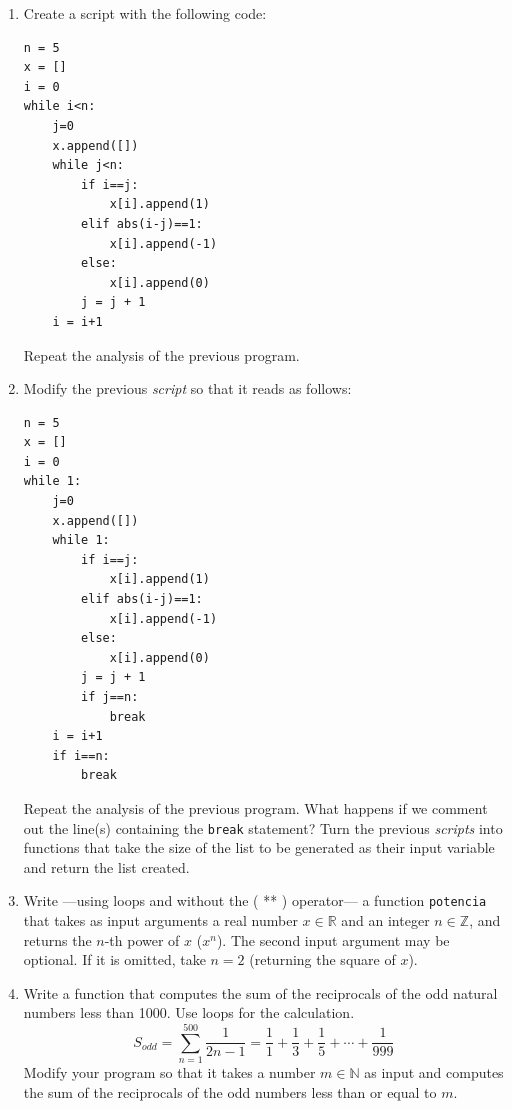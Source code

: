 \begin{enumerate}
\item Create a script with the following code:
\begin{verbatim}
n = 5
x = []
i = 0
while i<n:
    j=0
    x.append([])
    while j<n:
        if i==j:
            x[i].append(1)
        elif abs(i-j)==1:
            x[i].append(-1)
        else:
            x[i].append(0)
        j = j + 1
    i = i+1
\end{verbatim}

Repeat the analysis of the previous program.

\item Modify the previous \emph{script} so that it reads as follows:
\begin{verbatim}
n = 5
x = []
i = 0
while 1:
    j=0
    x.append([])
    while 1:
        if i==j:
            x[i].append(1)
        elif abs(i-j)==1:
            x[i].append(-1)
        else:
            x[i].append(0)
        j = j + 1
        if j==n:
            break
    i = i+1
    if i==n:
        break
\end{verbatim}
Repeat the analysis of the previous program. What happens if we comment out the line(s) containing the \verb|break| statement?
Turn the previous \emph{scripts} into functions that take the size of the list to be generated as their input variable and return the list created.

\item Write ---using loops and without the ( ** ) operator--- a function \verb|potencia| that takes as input arguments a real number $x\in \mathbb{R}$ and an integer $n \in \mathbb{Z}$, and returns the $n$-th power of $x$ ($x^n$). The second input argument may be optional. If it is omitted, take $n=2$ (returning the square of $x$).

\item Write a function that computes the sum of the reciprocals of the odd natural numbers less than 1000. Use loops for the calculation.
\begin{equation*}
S_{odd} = \sum_{n=1}^{500}\frac{1}{2n-1} =\frac{1}{1}+\frac{1}{3}+\frac{1}{5}+\cdots+\frac{1}{999}
\end{equation*}
Modify your program so that it takes a number $m\in\mathbb{N}$ as input and computes the sum of the reciprocals of the odd numbers less than or equal to $m$.


\end{enumerate}

